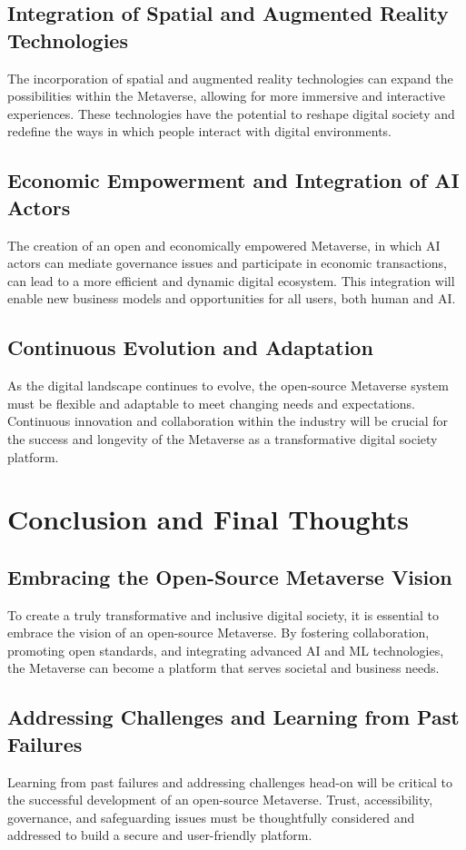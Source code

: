 \subsection{Integration of Spatial and Augmented Reality Technologies}
The incorporation of spatial and augmented reality technologies can expand the possibilities within the Metaverse, allowing for more immersive and interactive experiences. These technologies have the potential to reshape digital society and redefine the ways in which people interact with digital environments.

\subsection{Economic Empowerment and Integration of AI Actors}
The creation of an open and economically empowered Metaverse, in which AI actors can mediate governance issues and participate in economic transactions, can lead to a more efficient and dynamic digital ecosystem. This integration will enable new business models and opportunities for all users, both human and AI.

\subsection{Continuous Evolution and Adaptation}
As the digital landscape continues to evolve, the open-source Metaverse system must be flexible and adaptable to meet changing needs and expectations. Continuous innovation and collaboration within the industry will be crucial for the success and longevity of the Metaverse as a transformative digital society platform.

\section{Conclusion and Final Thoughts}
\subsection{Embracing the Open-Source Metaverse Vision}
To create a truly transformative and inclusive digital society, it is essential to embrace the vision of an open-source Metaverse. By fostering collaboration, promoting open standards, and integrating advanced AI and ML technologies, the Metaverse can become a platform that serves societal and business needs.

\subsection{Addressing Challenges and Learning from Past Failures}
Learning from past failures and addressing challenges head-on will be critical to the successful development of an open-source Metaverse. Trust, accessibility, governance, and safeguarding issues must be thoughtfully considered and addressed to build a secure and user-friendly platform.

